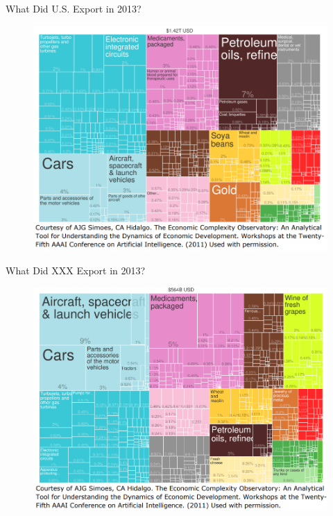 \documentclass[10pt,hyperref={CJKbookmarks=true},xcolor=dvipsnames,aspectratio=169]{beamer}
\begin{document}
\begin{frame}{What Did U.S. Export in 2013?}


\begin{figure}
\includegraphics[scale=0.35]{fig/gravity/com2-1.PNG}
\end{figure}

\end{frame}

\begin{frame}{What Did XXX Export in 2013?}


\begin{figure}
\includegraphics[scale=0.35]{fig/gravity/com2-2.PNG}
\end{figure}

\end{frame}
\end{document}
